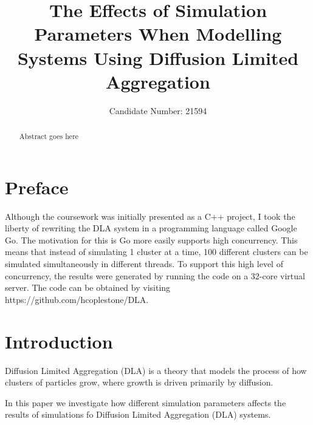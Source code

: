 \documentclass[11pt]{iopart}
\begin{document}
\setlength{\marginparwidth}{1.5cm}

\title[]{The Effects of Simulation Parameters When Modelling Systems Using Diffusion Limited Aggregation}

\author{Candidate Number: 21594}

\address{Department of Physics,
University of Bath, Bath BA2 7AY, United Kingdom}
\begin{abstract}
Abstract goes here
\end{abstract}

\listoftodos



\section*{Preface}
Although the coursework was initially presented as a C++ project, I took the liberty of rewriting the DLA system in a programming language called Google Go. The motivation for this is Go more easily supports high concurrency. This means that instead of simulating 1 cluster at a time, 100 different clusters can be simulated simultaneously in different threads. To support this high level of concurrency, the results were generated by running the code on a 32-core virtual server. The code can be obtained by visiting https://github.com/hcoplestone/DLA.

\section{Introduction}

Diffusion Limited Aggregation (DLA) is a theory that models the process of how clusters of particles grow, where growth is driven primarily by diffusion. \cite{dla}

In this paper we investigate how different simulation parameters affects the results of simulations fo Diffusion Limited Aggregation (DLA) systems.
\end{document}
